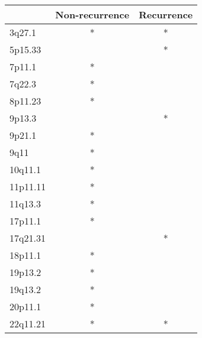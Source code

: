 \begin{tabular}{lcc}
\toprule
{} & Non-recurrence & Recurrence \\
\midrule
3q27.1   &              * &          * \\
5p15.33  &                &          * \\
7p11.1   &              * &            \\
7q22.3   &              * &            \\
8p11.23  &              * &            \\
9p13.3   &                &          * \\
9p21.1   &              * &            \\
9q11     &              * &            \\
10q11.1  &              * &            \\
11p11.11 &              * &            \\
11q13.3  &              * &            \\
17p11.1  &              * &            \\
17q21.31 &                &          * \\
18p11.1  &              * &            \\
19p13.2  &              * &            \\
19q13.2  &              * &            \\
20p11.1  &              * &            \\
22q11.21 &              * &          * \\
\bottomrule
\end{tabular}
